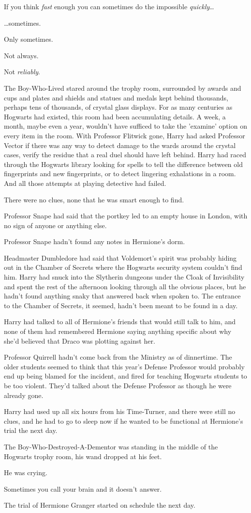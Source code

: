 If you think \emph{fast} enough you can sometimes do the impossible \emph{quickly}{\ldots}

{\ldots}sometimes.

Only sometimes.

Not always.

Not \emph{reliably}.

The Boy-Who-Lived stared around the trophy room, surrounded by awards and cups and plates and shields and statues and medals kept behind thousands, perhaps tens of thousands, of crystal glass displays. For as many centuries as Hogwarts had existed, this room had been accumulating details. A week, a month, maybe even a year, wouldn't have sufficed to take the 'examine' option on every item in the room. With Professor Flitwick gone, Harry had asked Professor Vector if there was any way to detect damage to the wards around the crystal cases, verify the residue that a real duel should have left behind. Harry had raced through the Hogwarts library looking for spells to tell the difference between old fingerprints and new fingerprints, or to detect lingering exhalations in a room. And all those attempts at playing detective had failed.

There were no clues, none that he was smart enough to find.

Professor Snape had said that the portkey led to an empty house in London, with no sign of anyone or anything else.

Professor Snape hadn't found any notes in Hermione's dorm.

Headmaster Dumbledore had said that Voldemort's spirit was probably hiding out in the Chamber of Secrets where the Hogwarts security system couldn't find him. Harry had snuck into the Slytherin dungeons under the Cloak of Invisibility and spent the rest of the afternoon looking through all the obvious places, but he hadn't found anything snaky that answered back when spoken to. The entrance to the Chamber of Secrets, it seemed, hadn't been meant to be found in a day.

Harry had talked to all of Hermione's friends that would still talk to him, and none of them had remembered Hermione saying anything specific about why she'd believed that Draco was plotting against her.

Professor Quirrell hadn't come back from the Ministry as of dinnertime. The older students seemed to think that this year's Defense Professor would probably end up being blamed for the incident, and fired for teaching Hogwarts students to be too violent. They'd talked about the Defense Professor as though he were already gone.

Harry had used up all six hours from his Time-Turner, and there were still no clues, and he had to go to sleep now if he wanted to be functional at Hermione's trial the next day.

The Boy-Who-Destroyed-A-Dementor was standing in the middle of the Hogwarts trophy room, his wand dropped at his feet.

He was crying.

Sometimes you call your brain and it doesn't answer.

The trial of Hermione Granger started on schedule the next day.